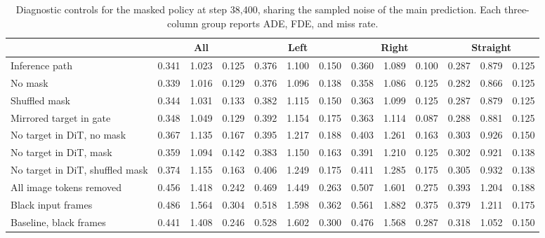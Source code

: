 \begin{table}[!htb]
\centering\tiny
\caption{Diagnostic controls for the masked policy at step 38{,}400, sharing the sampled noise of the main prediction. Each three-column group reports ADE, FDE, and miss rate.}
\label{tab:app_ctrl}
\begin{tabular}{lcccccccccccc}
\toprule
 & \multicolumn{3}{c}{All} & \multicolumn{3}{c}{Left} & \multicolumn{3}{c}{Right} & \multicolumn{3}{c}{Straight} \\
\midrule
Inference path & 0.341 & 1.023 & 0.125 & 0.376 & 1.100 & 0.150 & 0.360 & 1.089 & 0.100 & 0.287 & 0.879 & 0.125 \\
\midrule
No mask & 0.339 & 1.016 & 0.129 & 0.376 & 1.096 & 0.138 & 0.358 & 1.086 & 0.125 & 0.282 & 0.866 & 0.125 \\
Shuffled mask & 0.344 & 1.031 & 0.133 & 0.382 & 1.115 & 0.150 & 0.363 & 1.099 & 0.125 & 0.287 & 0.879 & 0.125 \\
Mirrored target in gate & 0.348 & 1.049 & 0.129 & 0.392 & 1.154 & 0.175 & 0.363 & 1.114 & 0.087 & 0.288 & 0.881 & 0.125 \\
No target in DiT, no mask & 0.367 & 1.135 & 0.167 & 0.395 & 1.217 & 0.188 & 0.403 & 1.261 & 0.163 & 0.303 & 0.926 & 0.150 \\
No target in DiT, mask & 0.359 & 1.094 & 0.142 & 0.383 & 1.150 & 0.163 & 0.391 & 1.210 & 0.125 & 0.302 & 0.921 & 0.138 \\
No target in DiT, shuffled mask & 0.374 & 1.155 & 0.163 & 0.406 & 1.249 & 0.175 & 0.411 & 1.285 & 0.175 & 0.305 & 0.932 & 0.138 \\
All image tokens removed & 0.456 & 1.418 & 0.242 & 0.469 & 1.449 & 0.263 & 0.507 & 1.601 & 0.275 & 0.393 & 1.204 & 0.188 \\
Black input frames & 0.486 & 1.564 & 0.304 & 0.518 & 1.598 & 0.362 & 0.561 & 1.882 & 0.375 & 0.379 & 1.211 & 0.175 \\
\midrule
Baseline, black frames & 0.441 & 1.408 & 0.246 & 0.528 & 1.602 & 0.300 & 0.476 & 1.568 & 0.287 & 0.318 & 1.052 & 0.150 \\
\bottomrule
\end{tabular}
\end{table}

